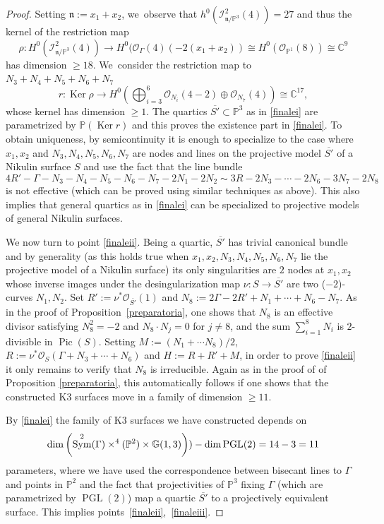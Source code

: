\documentclass[JEP,XML,SOM,Unicode,NoEqCountersInSection,published]{cedram}
\newcommand{\NoChangel}[1]{%
\expandafter\let\csname old\string#1\endcsname=#1
\let#1=\relax
\newcommand{#1}{\mathop{\mathcode`l="716C\csname old\string#1\endcsname\mathcode`l="7160}\nolimits}%
}
\theoremstyle{plain}
\theoremstyle{definition}
\DeclareMathOperator{\Hilb}{Hilb} \NoChangel{\Hilb}
\DeclareMathOperator{\Ker}{Ker}
\DeclareMathOperator{\PGL}{PGL}
\DeclareMathOperator{\Pic}{Pic}
\DeclareMathOperator{\Sym}{Sym}
\newcommand\CC{{\mathbb C}}
\newcommand\GG{{\mathbb G}}
\newcommand\PP{{\mathbb P}}
\renewcommand\O{{\mathcal O}}
\begin{document}
\begin{proof}
Setting $\mathfrak n:=x_1+x_2$, we~observe that $h^0(\mathcal I^2_{\mathfrak{n}/\PP^3}(4))=27$ and thus the kernel of the
restriction map
\begin{equation}\label{forza}
\rho: H^0(\mathcal I^2_{\mathfrak{n}/\PP^3}(4)) \to
H^0(\mathcal \O_{\Gamma}(4)(-2(x_1+x_2))\cong H^0(\O_{\PP^1}(8)) \cong \CC^9
\end{equation}
has dimension $\geq 18$. We~consider the restriction map to $N_3+N_4+N_5+N_6+N_7$
\begin{equation}\label{roma}
r: \Ker \rho \to H^0(\textstyle\bigoplus_{i=3}^6 \O_{N_i}(4-2)\oplus \O_{N_7}(4))\cong \CC^{17},
\end{equation}
whose kernel has dimension $\geq 1$. The quartics $\overline{S'}\subset\mathbb P^3$ as in \eqref{finalei} are parametrized by $\PP(\Ker r)$ and this proves the existence part in \eqref{finalei}. To obtain uniqueness, by semicontinuity it is enough to specialize to the case where $x_1,x_2$ and $N_3,N_4,N_5,N_6,N_7$ are nodes and lines on the projective model $\overline{S'}$ of a Nikulin surface $S$ and use the fact that the line bundle
\[
4R'-\Gamma-N_3-N_4-N_5-N_6-N_7-2N_1-2N_2 \sim 3R-2N_3-\cdots-2N_6-3N_7-2N_8
\]
is not effective (which can be proved using similar techniques as above). This also implies that general quartics as in \eqref{finalei} can be specialized to projective models of general Nikulin surfaces.

We now turn to point \eqref{finaleii}. Being a quartic, $\overline{S'}$ has trivial canonical bundle and by generality (as this holds true when $x_1,x_2,N_3,N_4,N_5,N_6,N_7$ lie the projective model of a Nikulin surface) its only singularities are $2$ nodes at $x_1,x_2$ whose inverse images under the desingularization map $\nu:S\to\overline{S'}$ are two ($-2$)-curves $N_1,N_2$. Set $R':=\nu^*\mathcal O_{\overline{S'}}(1)$ and $N_8:=2\Gamma-2R'+N_1+\cdots +N_6-N_7$. As in the proof of Proposition~\ref{preparatoria}, one shows that $N_8$ is an effective divisor satisfying $N_8^2=-2$ and $N_8\cdot N_j=0$ for $j\neq 8$, and the sum $\sum_{i=1}^8N_i$ is $2$-divisible in $\Pic(S)$. Setting $M:=(N_1+\cdots N_8)/2$, $R:=\nu^*\mathcal{O}_{ S}(\Gamma+N_3+\cdots+N_6)$ and $H:=R+R'+M$, in order to prove \eqref{finaleii} it only remains to verify that $N_8$ is irreducible. Again as in the proof of of Proposition \ref{preparatoria}, this automatically follows if one shows that the constructed K3 surfaces move in a family of dimension $\geq11$.

By \eqref{finalei} the family of K3 surfaces we have constructed depends on
\[
\dim\left(\Sym ^2(\Gamma)\times \Hilb^4(\mathbb P^2)\times \GG(1,3)\right))-\dim \PGL(2)=14-3=11
\]
parameters, where we have used the correspondence between bisecant lines to $\Gamma$ and points in $\PP^2$ and the fact that projectivities of $\mathbb P^3$ fixing $\Gamma$ (which are parametrized by $\PGL(2)$) map a quartic $\overline{S'}$ to a projectively equivalent surface. This implies points~\eqref{finaleii},~\eqref{finaleiii}.
\end{proof}
\end{document}
